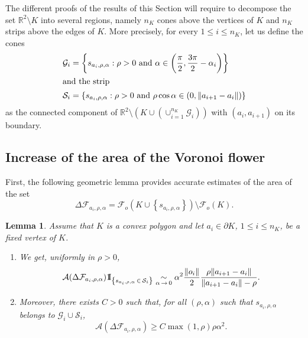 \documentclass[10pt]{amsart}
\newtheorem{lemm}[theo]{Lemma}\newtheorem{prop}[theo]{Proposition}\newtheorem{coro}[theo]{Corollary}\newtheorem{conj}[theo]{Conjecture}
\theoremstyle{definition}\newtheorem{defi}[theo]{Definition}\newtheorem{rema}[theo]{Remark}\newtheorem{exam}[theo]{Example}\newtheorem{exem}[theo]{Example}\newtheorem{nota}[theo]{Notation}
\newcommand{\indicat}{{\text{1}}\negthickspace\text{I}}
\newcommand{\cA}{\mathcal{A}}
\newcommand{\cF}{\mathcal{F}}
\newcommand{\cG}{\mathcal{G}}
\newcommand{\cS}{\mathcal{S}}
\newcommand{\R}{\mathbb{R}}
\newcommand{\pass}{\vspace{0.3cm}\noindent}
\newcommand{\noi}{\noindent}
\newcommand*{\romanenumi}{\renewcommand*{\theenumi}{\roman{enumi}}}
\begin{document}
The different proofs of the results of this Section will require to decompose the set $\R^2\setminus K$ into several regions, namely $n_K$ cones above the vertices of $K$ and $n_K$ strips above the edges of $K$. More precisely, for every $1\le i \le n_K$, let us define the cones
\begin{align*}
\cG_i &=\left\{s_{a_i,\rho,\alpha}:\rho>0 \text{ and } \alpha\in\left(\frac{\pi}{2},\frac{3\pi}{2}-\alpha_i\right)\right\}
\\
\intertext{and the strip}
\cS_i &=\left\{s_{a_i,\rho,\alpha}:\rho>0 \text{ and } \rho\cos\alpha\in(0,\|a_{i+1}-a_i\|)\right\}
\end{align*}
as the connected component of $\R^2\setminus (K\cup(\cup_{i=1}^{n_K}\cG_i))$ with $(a_i,a_{i+1})$ on its boundary.


\subsection{Increase of the area of the Voronoi flower}\label{subsec:fleurpoly}


First, the following geometric lemma provides accurate estimates of the area of the set
\begin{equation*}\label{def:diffvorflowpoly}
\Delta\cF_{a_i,\rho,\alpha}=\cF_o(K \cup \left\{s_{a_i,\rho,\alpha}\right\})\setminus\cF_o(K).
\end{equation*}

\begin{lemm}\label{lem:geompoly1}
Assume that $K$ is a convex polygon and let $a_i\in\partial K$, $1\leq i \leq n_K$, be a fixed vertex of $K$.
\begin{enumerate}\romanenumi
\item\label{estimeevolfleurpoly1} We get, uniformly in $\rho>0$,
\[
\cA(\Delta\cF_{a_i,\rho,\alpha})\indicat_{\left\{s_{a_i,\rho,\alpha}\,\in\,\cS_i\right\}}\underset{\alpha\,\to\,0}{\sim} \alpha^2\frac{\|o_i\|}{2}\frac{\rho\|a_{i+1}-a_i\|}{\|a_{i+1}-a_i\|-\rho}.
\]
\item\label{estimeevolfleurpoly2} Moreover, there exists $C>0$ such that, for all $(\rho,\alpha)$ such that $s_{a_i,\rho,\alpha}$ belongs to $\cG_i\cup\cS_i$,
\[
\cA\left(\Delta\cF_{a_i,\rho,\alpha}\right)\ge C\max(1,\rho)\rho\alpha^2.
\]
\end{enumerate}
\end{lemm}
\end{document}
